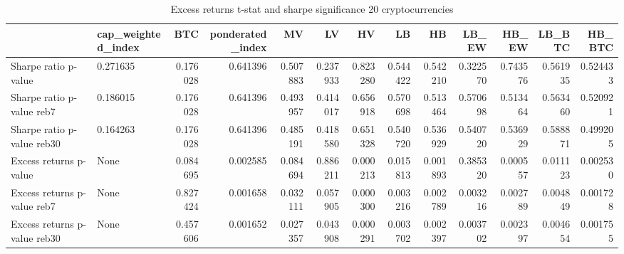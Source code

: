 \begin{table}
\centering
\caption{Excess returns t-stat and sharpe significance 20 cryptocurrencies}
\label{signif20_30}
\begin{tabular}{llrrrrrrrrrrr}
\toprule
{} & cap\_weighted\_index &       BTC &  ponderated\_index &        MV &        LV &        HV &        LB &        HB &     LB\_EW &     HB\_EW &    LB\_BTC &    HB\_BTC \\
\midrule
Sharpe ratio p-value         &           0.271635 &  0.176028 &          0.641396 &  0.507883 &  0.237933 &  0.823280 &  0.544422 &  0.542210 &  0.322570 &  0.743576 &  0.561935 &  0.524433 \\
Sharpe ratio p-value reb7    &           0.186015 &  0.176028 &          0.641396 &  0.493957 &  0.414017 &  0.656918 &  0.570698 &  0.513464 &  0.570698 &  0.513464 &  0.563460 &  0.520921 \\
Sharpe ratio p-value reb30   &           0.164263 &  0.176028 &          0.641396 &  0.485191 &  0.418580 &  0.651328 &  0.540720 &  0.536929 &  0.540720 &  0.536929 &  0.588871 &  0.499205 \\
Excess returns p-value       &               None &  0.084695 &          0.002585 &  0.084694 &  0.886211 &  0.000213 &  0.015813 &  0.001893 &  0.385320 &  0.000557 &  0.011123 &  0.002530 \\
Excess returns p-value reb7  &               None &  0.827424 &          0.001658 &  0.032111 &  0.057905 &  0.000300 &  0.003216 &  0.002789 &  0.003216 &  0.002789 &  0.004849 &  0.001728 \\
Excess returns p-value reb30 &               None &  0.457606 &          0.001652 &  0.027357 &  0.043908 &  0.000291 &  0.003702 &  0.002397 &  0.003702 &  0.002397 &  0.004654 &  0.001755 \\
\bottomrule
\end{tabular}
\end{table}
